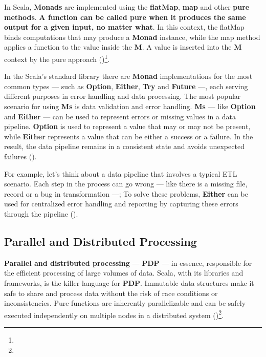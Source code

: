 In Scala, \textbf{Monads} are implemented using the \textbf{flatMap}, \textbf{map} and other \textbf{pure methods}. \textbf{A function can be called pure when it produces the same output for a given input, no matter what}. In this context, the flatMap binds computations that may produce a \textbf{Monad} instance, while the map method applies a function to the value inside the \textbf{M}. A value is inserted into the \textbf{M} context by the pure approach (\cite{joshuad.suerethScalaDepth2012})\footnote[4]{}.

In the Scala's standard library there are \textbf{Monad} implementations for the most common types — such as \textbf{Option}, \textbf{Either}, \textbf{Try} and \textbf{Future} —, each serving different purposes in error handling and data processing. The most popular scenario for using \textbf{Ms} is data validation and error handling. \textbf{Ms} — like \textbf{Option} and \textbf{Either} — can be used to represent errors or missing values in a data pipeline. \textbf{Option} is used to represent a value that may or may not be present, while \textbf{Either} represents a value that can be either a success or a failure. In the result, the data pipeline remains in a consistent state and avoids unexpected failures (\cite{joshuad.suerethScalaDepth2012})\footnotemark[4].

For example, let's think about a data pipeline that involves a typical ETL scenario. Each step in the process can go wrong — like there is a missing file, record or a bug in transformation —; To solve these problems, \textbf{Either} can be used for centralized error handling and reporting by capturing these errors through the pipeline (\cite{joshuad.suerethScalaDepth2012})\footnotemark[4].



\subsection{Parallel and Distributed Processing}

\textbf{Parallel and distributed processing} — \textbf{PDP} — in essence, responsible for the efficient processing of large volumes of data. Scala, with its libraries and frameworks, is the killer language for \textbf{PDP}. Immutable data structures make it safe to share and process data without the risk of race conditions or inconsistencies. Pure functions are inherently parallelizable and can be safely executed independently on multiple nodes in a distributed system (\cite{tomeDataEngineeringScala2024})\footnote[10]{}.

